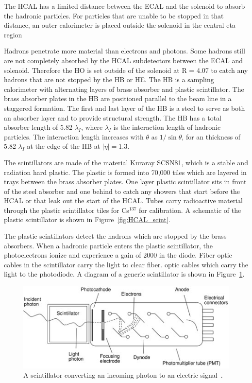 The HCAL has a limited distance between the ECAL and the solenoid to absorb the hadronic particles. For particles that are unable to be stopped in that distance, an outer calorimeter is placed outside the solenoid in the central eta region



Hadrons penetrate more material than electrons and photons. Some hadrons still are not completely absorbed by the HCAL subdetectors between the ECAL and solenoid. Therefore the HO is set outside of the solenoid at R = 4.07 to catch any hadrons that are not stopped by the HB or HE. The HB is a sampling calorimeter with alternating layers of brass absorber and plastic scintillator. The brass absorber plates in the HB are positioned parallel to the beam line in a staggered formation. The first and last layer of the HB is a steel to serve as both an absorber layer and to provide structural strength. The HB has a total absorber length of 5.82 $\lambda_I$, where $\lambda_I$ is the interaction length of hadronic particles. The interaction length increases with $\theta$ as $1/\sin{\theta}$, for an thickness of 5.82 $\lambda_I$ at the edge of the HB at $|\eta| = 1.3$.

The scintillators are made of the material Kuraray SCSN81, which is a stable and radiation hard plastic. The plastic is formed into 70,000 tiles which are layered in trays between the brass absorber plates. One layer plastic scintillator sits in front of the steel absorber and one behind to catch any showers that start before the HCAL or that leak out the start of the HCAL. Tubes carry radioactive material through the plastic scintillator tiles for Cs$^{137}$ for calibration. A schematic of the plastic scintillator is shown in Figure~\ref{fig:HCAL_scint}.

The plastic scintillators detect the hadrons which are stopped by the brass absorbers. When a hadronic particle enters the plastic scintillator, the photoelectrons ionize and experience a gain of 2000 in the diode. Fiber optic cables in the scintillator carry the light to clear fiber. optic cables which carry the light to the photodiode. A diagram of a generic scintillator is shown in Figure~\ref{fig:scintillator}.

\begin{figure}[h]
\centering
\includegraphics[width=1.0\textwidth]{figures/scintillator.jpg}
\caption{A scintillator converting an incoming photon to an electric signal~\cite{scintillator}.}
\label{fig:scintillator}
\end{figure}

